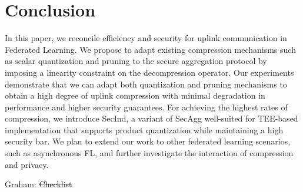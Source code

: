 \documentclass{article}
\newcommand{\SecInd}{{\sc SecInd}\xspace}
\newcommand{\SecAgg}{{\sc SecAgg}\xspace}
\newcommand{\graham}[1]{{\color{green}Graham: #1}}
\begin{document}
\section{Conclusion}
In this paper, we reconcile efficiency and security for uplink communication in Federated Learning. We propose to adapt existing compression mechanisms such as scalar quantization and pruning to the secure aggregation protocol by imposing a linearity constraint on the decompression operator. Our experiments demonstrate that we can adapt both quantization and pruning mechanisms to obtain a high degree of uplink compression with minimal degradation in performance and higher security guarantees. For achieving the highest rates of compression, we introduce \SecInd, a variant of \SecAgg well-suited for TEE-based implementation that supports product quantization while maintaining a high security bar. 
We plan to extend our work to other federated learning scenarios, such as asynchronous FL, and further investigate the interaction of compression and privacy.






\graham{\sout{Checklist}}


\appendix



\end{document}
